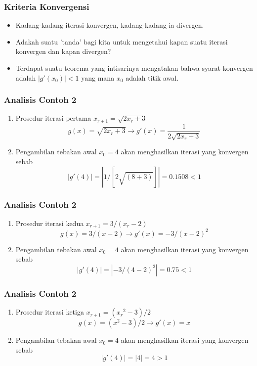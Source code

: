 \documentclass[pdflatex,compress]{beamer}
\begin{document}
\begin{frame}
	\frametitle{Kriteria Konvergensi}
	\begin{itemize}
		\item Kadang-kadang iterasi konvergen, kadang-kadang ia divergen.
		\item Adakah suatu 'tanda' bagi kita untuk mengetahui kapan suatu iterasi konvergen dan kapan divergen?
		\item Terdapat suatu teorema yang intisarinya mengatakan bahwa syarat konvergen adalah $ |g'(x_0)| < 1 $ yang mana $ x_0 $ adalah titik awal.
	\end{itemize}
\end{frame}

\begin{frame}
	\frametitle{Analisis Contoh 2}
	\begin{enumerate}
		\item Prosedur iterasi pertama $ x_{r+1} = \sqrt{2x_r + 3} $
		\[ g(x) =  \sqrt{2x_r + 3} \rightarrow g'(x) =  \frac{1}{2\sqrt{2x_r + 3}} \]
		\item[] Pengambilan tebakan awal $ x_0 = 4 $ akan menghasilkan iterasi yang konvergen sebab
		\[ |g'(4)| = |1 / [2 \sqrt{(8+3)}]| = 0.1508 < 1\]
	\end{enumerate}
\end{frame}

\begin{frame}
	\frametitle{Analisis Contoh 2}
	\begin{enumerate}
		\item Prosedur iterasi kedua $ x_{r+1} = 3/(x_r - 2) $
		\[ g(x) =  3/(x - 2) \rightarrow g'(x) =  -3/(x - 2)^2 \]
		\item[] Pengambilan tebakan awal $ x_0 = 4 $ akan menghasilkan iterasi yang konvergen sebab
		\[ |g'(4)| = |-3/(4-2)^2| = 0.75 < 1\]
	\end{enumerate}
\end{frame}

\begin{frame}
	\frametitle{Analisis Contoh 2}
	\begin{enumerate}
		\item Prosedur iterasi ketiga $ x_{r+1} = ({x_r}^2 - 3)/2 $
		\[ g(x) = ({x}^2 - 3)/2 \rightarrow g'(x) =  x \]
		\item[] Pengambilan tebakan awal $ x_0 = 4 $ akan menghasilkan iterasi yang konvergen sebab
		\[ |g'(4)| = |4| = 4 > 1\]
	\end{enumerate}
\end{frame}
\end{document}
